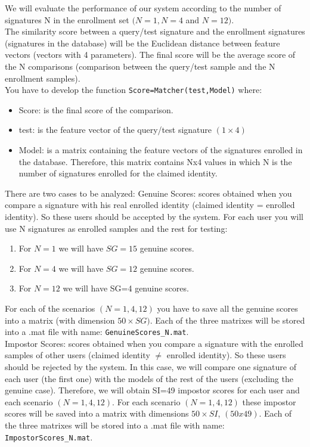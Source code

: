 \documentclass[a4paper]{article}
\def\inline{\lstinline[basicstyle=\ttfamily,keywordstyle={}]}
\begin{document}
{We will evaluate the performance of our system according to the number of signatures N in the enrollment set \((N=1, N=4 \) and \(N=12)\).\\

The similarity score between a query/test signature and the enrollment signatures (signatures in the database) will be the Euclidean distance between feature vectors (vectors with 4 parameters).  The final score will be the average score of the N comparisons (comparison between the query/test sample and the N enrollment samples).\\

You have to develop the function \inline{Score=Matcher(test,Model)} where:
\begin{itemize}
\item	Score: is the final score of the comparison.
\item	test: is the feature vector of the query/test signature \((1\times4)\)
\item	Model: is a matrix containing the feature vectors of the signatures enrolled in the database. Therefore, this matrix contains Nx4 values in which N is the number of signatures enrolled for the claimed identity.
\end{itemize}
There are two cases to be analyzed:
Genuine Scores: scores obtained when you compare a signature with his real enrolled identity (claimed identity = enrolled identity). So these users should be accepted by the system. For each user you will use N signatures as enrolled samples and the rest for testing:
\begin{enumerate}
\item	For \(N=1\) we will have \(SG=15\) genuine scores.
\item	For \(N=4\) we will have \(SG=12\) genuine scores.
\item	For \(N=12\) we will have SG=4 genuine scores.
\end{enumerate}
For each of the scenarios \((N=1,4,12)\) you have to save all the genuine scores into a matrix (with dimension \(50 \times SG)\). Each of the three matrixes will be stored into a .mat file with name: \inline{GenuineScores_N.mat}.\\

Impostor Scores: scores obtained when you compare a signature with the enrolled samples of other users (claimed identity $\neq$ enrolled identity). So these users should be rejected by the system. In this case, we will compare one signature of each user (the first one) with the models of the rest of the users (excluding the genuine case). Therefore, we will obtain SI=49 impostor scores for each user and each scenario \((N=1,4,12)\).
For each scenario \((N=1,4,12)\) these impostor scores will be saved into a matrix with dimensions \(50\times SI\), \((50x49)\). Each of the three matrixes will be stored into a .mat file with name: \inline{ImpostorScores_N.mat}.

}
\end{document}
